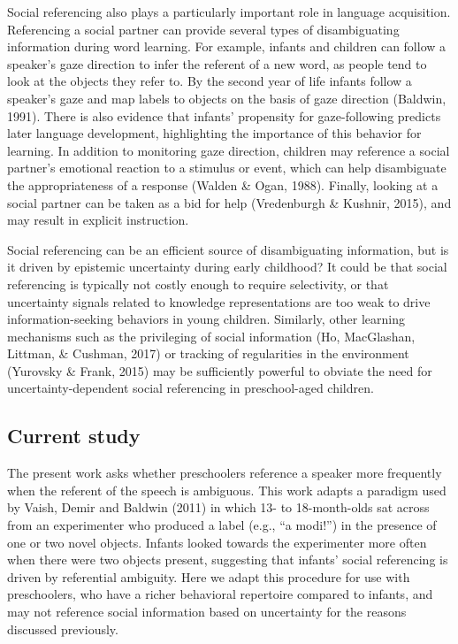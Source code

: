\documentclass[a4paper,man,apacite,floatsintext]{apa6}
\begin{document}
Social referencing also plays a particularly important role in language
acquisition. Referencing a social partner can provide several types of
disambiguating information during word learning. For example, infants
and children can follow a speaker's gaze direction to infer the referent
of a new word, as people tend to look at the objects they refer to. By
the second year of life infants follow a speaker's gaze and map labels
to objects on the basis of gaze direction (Baldwin, 1991). There is also
evidence that infants' propensity for gaze-following predicts later
language development, highlighting the importance of this behavior for
learning. In addition to monitoring gaze direction, children may
reference a social partner's emotional reaction to a stimulus or event,
which can help disambiguate the appropriateness of a response (Walden \&
Ogan, 1988). Finally, looking at a social partner can be taken as a bid
for help (Vredenburgh \& Kushnir, 2015), and may result in explicit
instruction.

Social referencing can be an efficient source of disambiguating
information, but is it driven by epistemic uncertainty during early
childhood? It could be that social referencing is typically not costly
enough to require selectivity, or that uncertainty signals related to
knowledge representations are too weak to drive information-seeking
behaviors in young children. Similarly, other learning mechanisms such
as the privileging of social information (Ho, MacGlashan, Littman, \&
Cushman, 2017) or tracking of regularities in the environment (Yurovsky
\& Frank, 2015) may be sufficiently powerful to obviate the need for
uncertainty-dependent social referencing in preschool-aged children.

\subsection{Current study}\label{current-study}

The present work asks whether preschoolers reference a speaker more
frequently when the referent of the speech is ambiguous. This work
adapts a paradigm used by Vaish, Demir and Baldwin (2011) in which 13-
to 18-month-olds sat across from an experimenter who produced a label
(e.g., ``a modi!'') in the presence of one or two novel objects. Infants
looked towards the experimenter more often when there were two objects
present, suggesting that infants' social referencing is driven by
referential ambiguity. Here we adapt this procedure for use with
preschoolers, who have a richer behavioral repertoire compared to
infants, and may not reference social information based on uncertainty
for the reasons discussed previously.
\end{document}
